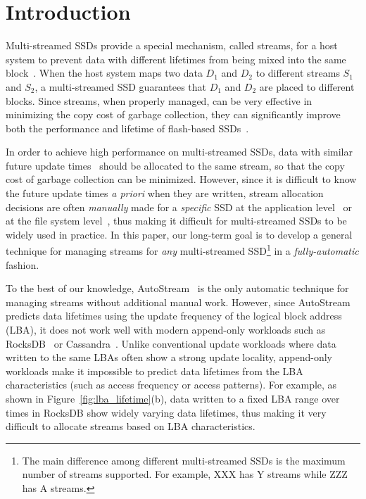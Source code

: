 \section{Introduction}
\label{sec:intro}
Multi-streamed SSDs provide a special mechanism,
called streams, for a host system to prevent data with different lifetimes 
from being mixed into the same block~\cite{T10, MultiStream}.
When the host system maps two data $D_1$ and $D_2$ to 
different streams $S_1$ and $S_2$, a multi-streamed SSD guarantees that 
$D_1$ and $D_2$ are placed to different blocks.   
Since streams, when properly managed, can be very effective in minimizing 
the copy cost of garbage collection, they
can significantly improve both the performance and lifetime of 
flash-based SSDs~\cite{MultiStream, FStream, AutoStream, Level}.

In order to achieve high performance on multi-streamed SSDs, data with similar 
future update times~\cite{PCHa}
should be allocated 
to the same stream, so that the copy cost of garbage collection can be minimized.
However, since it is difficult to know the future update times {\it a priori} when they are written,
stream allocation decisions are often {\it manually} made for a {\it specific} SSD 
at the application level~\cite{MultiStream} or at the file system level~\cite{FStream}, 
thus making it difficult for multi-streamed SSDs to be widely used in practice.  
In this paper, our long-term goal is to develop a general technique for managing streams 
for {\it any} multi-streamed SSD\footnote{The main difference among different multi-streamed 
SSDs is the maximum number of streams supported.  
For example, XXX has Y streams while ZZZ has A streams.} in a {\it fully-automatic} fashion. 

To the best of our knowledge, AutoStream~\cite{AutoStream} is the only automatic technique 
for managing streams without additional manual work.  
However, since AutoStream predicts data lifetimes using the update frequency 
of the logical block address (LBA), it does not work well with modern append-only workloads 
such as RocksDB~\cite{RocksDB} or Cassandra~\cite{Cassandra}.  
Unlike conventional update workloads where data written to the same LBAs 
often show a strong update locality, 
append-only workloads make it impossible to predict data lifetimes 
from the LBA characteristics (such as access frequency or access patterns).  
For example, as shown in Figure~\ref{fig:lba_lifetime}(b), 
data written to a fixed LBA range over times in RocksDB 
show widely varying data lifetimes, 
thus making it very difficult to allocate streams based on LBA characteristics.

